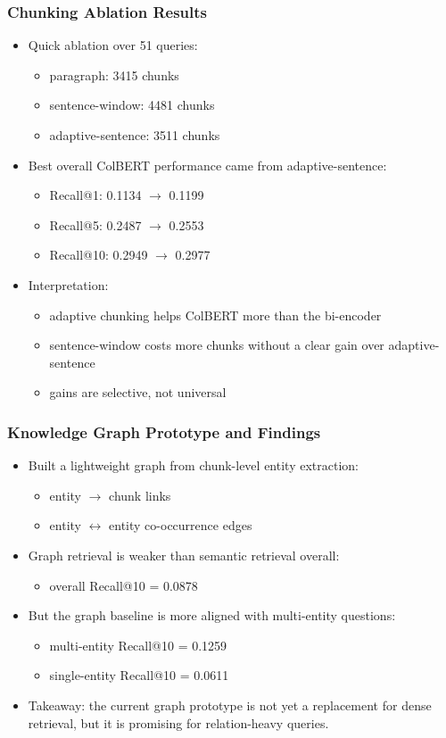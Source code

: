\documentclass{beamer}
\begin{document}
\begin{frame}
\frametitle{Chunking Ablation Results}
\small
\begin{itemize}
  \item Quick ablation over 51 queries:
  \begin{itemize}
    \item paragraph: 3415 chunks
    \item sentence-window: 4481 chunks
    \item adaptive-sentence: 3511 chunks
  \end{itemize}
  \item Best overall ColBERT performance came from adaptive-sentence:
  \begin{itemize}
    \item Recall@1: 0.1134 $\rightarrow$ 0.1199
    \item Recall@5: 0.2487 $\rightarrow$ 0.2553
    \item Recall@10: 0.2949 $\rightarrow$ 0.2977
  \end{itemize}
  \item Interpretation:
  \begin{itemize}
    \item adaptive chunking helps ColBERT more than the bi-encoder
    \item sentence-window costs more chunks without a clear gain over adaptive-sentence
    \item gains are selective, not universal
  \end{itemize}
\end{itemize}
\end{frame}

\begin{frame}
\frametitle{Knowledge Graph Prototype and Findings}
\small
\begin{itemize}
  \item Built a lightweight graph from chunk-level entity extraction:
  \begin{itemize}
    \item entity $\rightarrow$ chunk links
    \item entity $\leftrightarrow$ entity co-occurrence edges
  \end{itemize}
  \item Graph retrieval is weaker than semantic retrieval overall:
  \begin{itemize}
    \item overall Recall@10 = 0.0878
  \end{itemize}
  \item But the graph baseline is more aligned with multi-entity questions:
  \begin{itemize}
    \item multi-entity Recall@10 = 0.1259
    \item single-entity Recall@10 = 0.0611
  \end{itemize}
  \item Takeaway: the current graph prototype is not yet a replacement for dense retrieval, but it is promising for relation-heavy queries.
\end{itemize}
\end{frame}
\end{document}
